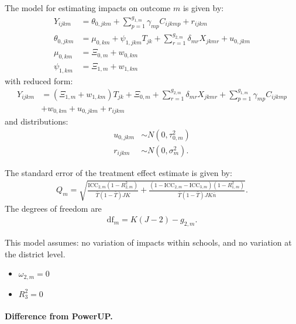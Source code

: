 \documentclass[12pt]{article}
\begin{document}
The model for estimating impacts on outcome $m$ is given by:
\begin{align}
Y_{ijkm} &=  \theta_{0,jkm} + \sum_{p=1}^{g_{1,m}} \gamma_{mp} C_{ijkmp} + r_{ijkm}\\
\nonumber \theta_{0,jkm} &= \mu_{0,km} + \psi_{1,jkm} T_{jk} + \sum_{r=1}^{g_{2,m}} \delta_{mr} X_{jkmr} + u_{0,jkm}\\
\nonumber \mu_{0,km}  &= \Xi_{0,m}  + w_{0,km}\\
\nonumber \psi_{1,km} &= \Xi_{1,m} + w_{1,km}
\end{align}
with reduced form:
\begin{align}
Y_{ijkm} &= \left(\Xi_{1,m} + w_{1,km} \right) T_{jk} + \Xi_{0,m} + \sum_{r=1}^{g_{2,m}} \delta_{mr} X_{jkmr} + \sum_{p=1}^{g_{1,m}} \gamma_{mp} C_{ijkmp}\\
\nonumber &+ w_{0,km} + u_{0,jkm} + r_{ijkm}
\end{align}
and distributions:
\begin{align}
u_{0,jkm} &\sim N\left(0, \tau^2_{0,m}\right)\\
\nonumber r_{ijkm} &\sim N\left(0, \sigma^2_m\right).
\end{align}

The standard error of the treatment effect estimate is given by:
\begin{align}
Q_m = \sqrt{
\frac{\text{ICC}_{2,m}(1 - R^2_{2,m})}{\bar{T}(1 - \bar{T}) JK} +
\frac{(1-\text{ICC}_{2,m} - \text{ICC}_{3,m})(1-R^2_{1,m})}{\bar{T}(1 - \bar{T}) J K\bar{n}} }.\end{align}
The degrees of freedom are
\begin{align}\text{df}_m = K( J - 2) - g_{2,m}.\end{align}

This model assumes: no variation of impacts within schools, and no variation at the district level.
\begin{itemize}
\item $\omega_{2,m} = 0$
\item $R^2_3 = 0$
\end{itemize}

\paragraph{Difference from PowerUP.}
\end{document}
